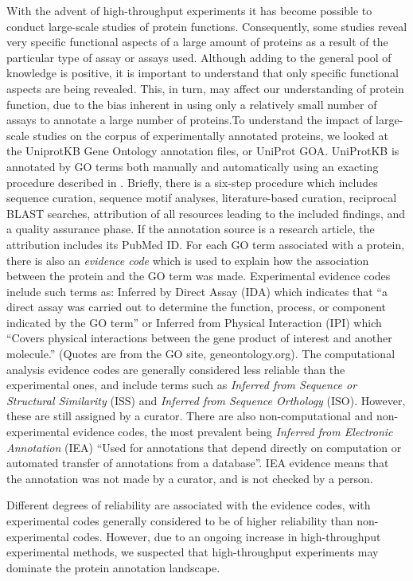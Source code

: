 \documentclass[10pt]{bmc_article}
\newenvironment{bmcformat}{\begin{raggedright}\baselineskip20pt\sloppy\setboolean{publ}{false}}{\end{raggedright}\baselineskip20pt\sloppy}
\begin{document}
\begin{bmcformat}
With the advent of high-throughput experiments it has become possible to conduct large-scale studies of protein
functions. Consequently, some studies reveal very specific functional aspects of a large amount of proteins as
a result of the particular type of assay or assays used. Although adding to the general pool of knowledge is
positive, it is important to understand that only specific functional aspects are being revealed. This, in
turn, may affect our understanding of protein function, due to the bias inherent in using only a relatively
small number of assays to annotate a large number of proteins.To understand the impact of large-scale studies on the
corpus of experimentally annotated proteins, we looked at the UniprotKB Gene Ontology annotation files, or
UniProt GOA. UniProtKB is annotated by GO terms both manually and automatically using an exacting procedure
described in \cite{UniprotKB-GOA}. Briefly, there is a six-step procedure which includes sequence curation,
sequence motif analyses, literature-based curation, reciprocal BLAST\cite{BLAST} searches, attribution of all
resources leading to the included findings, and a quality assurance phase. If the annotation source is a
research article, the attribution includes its PubMed ID.  For each GO term associated with a protein, there is
also an \textit{evidence code} which is used to explain how the association between the protein and the GO term
was made. Experimental evidence codes include such terms as: Inferred by Direct Assay (IDA) which indicates
that ``a direct assay was carried out to determine the function, process, or component indicated by the GO
term'' or Inferred from Physical Interaction (IPI) which ``Covers physical interactions between the gene
product of interest and another molecule.'' (Quotes are from the GO site, geneontology.org). The computational
analysis evidence codes are generally considered less reliable than the experimental ones, and include terms
such as \textit{Inferred from Sequence or Structural Similarity} (ISS) and \textit{Inferred from Sequence
Orthology} (ISO). However, these are still assigned by a curator. There are also non-computational and
non-experimental evidence codes, the most prevalent being \textit{Inferred from Electronic Annotation} (IEA)
``Used for annotations that depend directly on computation or automated transfer of annotations from a
database''. IEA evidence means that the annotation was not made by a curator, and is not checked by a person.

Different degrees of reliability are associated with the  evidence codes, with
experimental codes generally considered to be of higher reliability than non-experimental
codes. However, due to an ongoing increase in high-throughput experimental
methods, we suspected that high-throughput experiments may dominate the protein
annotation landscape. 


\end{bmcformat}
\end{document}
